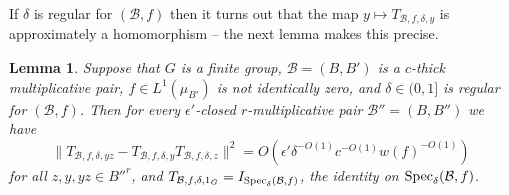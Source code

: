 \documentclass[12pt]{amsart}
\numberwithin{equation}{section}
\theoremstyle{plain}
\newtheorem{lemma}[subsection]{Lemma}
\theoremstyle{definition}
\providecommand{\Spec}{\mathop{\rm Spec}\nolimits}
\begin{document}
If $\delta$ is regular for $(\mathcal{B},f)$ then it turns out that the map $y \mapsto T_{\mathcal{B},f,\delta,y}$ is approximately a homomorphism -- the next lemma makes this precise. 
\begin{lemma}\label{lem.apxhom}
Suppose that $G$ is a finite group, $\mathcal{B}=(B,B')$ is a $c$-thick multiplicative pair, $f \in L^1(\mu_{B'})$ is not identically zero, and $\delta \in (0,1]$ is regular for $(\mathcal{B},f)$. Then for every $\epsilon'$-closed $r$-multiplicative pair $\mathcal{B}''=(B,B'')$ we have
\begin{equation*}
\|T_{\mathcal{B},f,\delta,yz}- T_{\mathcal{B},f,\delta,y}T_{\mathcal{B},f,\delta,z}\|^2 = O(\epsilon'\delta^{-O(1)}c^{-O(1)}w(f)^{-O(1)})
\end{equation*}
for all $z,y,yz \in B''^r$, and $T_{\mathcal{B},f,\delta,1_G}= I_{\Spec_\delta(\mathcal{B},f)}$, the identity on $\Spec_\delta(\mathcal{B},f)$.
\end{lemma}
\end{document}
